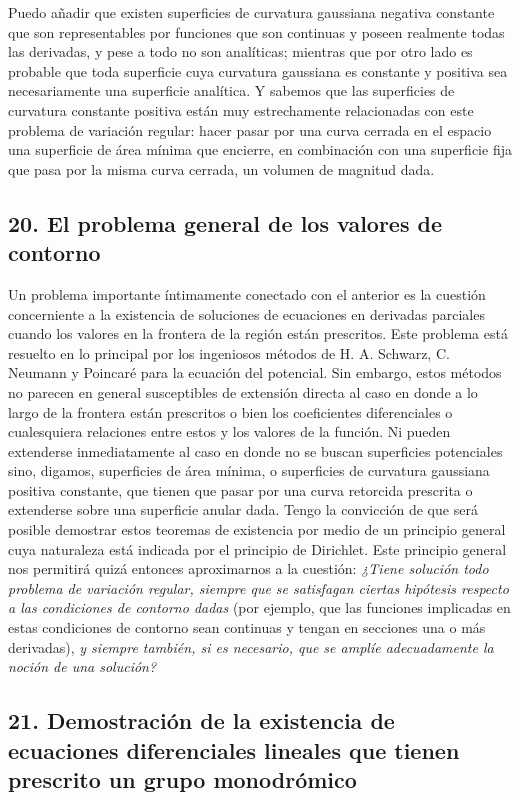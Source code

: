 \documentclass[a4paper, 12pt]{article}
\begin{document}
{Puedo añadir que existen superficies de curvatura gaussiana negativa constante que son representables por funciones que son continuas y poseen realmente todas las derivadas, y pese a todo no son analíticas; mientras que por otro lado es probable que toda superficie cuya curvatura gaussiana es constante y positiva sea necesariamente una superficie analítica. Y sabemos que las superficies de curvatura constante positiva están muy estrechamente relacionadas con este problema de variación regular: hacer pasar por una curva cerrada en el espacio una superficie de área mínima que encierre, en combinación con una superficie fija que pasa por la misma curva cerrada, un volumen de magnitud dada.


\subsection*{20. El problema general de los valores de contorno}

Un problema importante íntimamente conectado con el anterior es la cuestión concerniente a la existencia de soluciones de ecuaciones en derivadas parciales cuando los valores en la frontera de la región están prescritos. Este problema está resuelto en lo principal por los ingeniosos métodos de H. A. Schwarz, C. Neumann y Poincaré para la ecuación del potencial. Sin embargo, estos métodos no parecen en general susceptibles de extensión directa al caso en donde a lo largo de la frontera están prescritos o bien los coeficientes diferenciales o cualesquiera relaciones entre estos y los valores de la función. Ni pueden extenderse inmediatamente al caso en donde no se buscan superficies potenciales sino, digamos, superficies de área mínima, o superficies de curvatura gaussiana positiva constante, que tienen que pasar por una curva retorcida prescrita o extenderse sobre una superficie anular dada. Tengo la convicción de que será posible demostrar estos teoremas de existencia por medio de un principio general cuya naturaleza está indicada por el principio de Dirichlet. Este principio general nos permitirá quizá entonces aproximarnos a la cuestión: \textit{¿Tiene solución todo problema de variación regular, siempre que se satisfagan ciertas hipótesis respecto a las condiciones de contorno dadas} (por ejemplo, que las funciones implicadas en estas condiciones de contorno sean continuas y tengan en secciones una o más derivadas), \textit{y siempre también, si es necesario, que se amplíe adecuadamente la noción de una solución?}


\subsection*{21. Demostración de la existencia de ecuaciones diferenciales
lineales que tienen prescrito un grupo monodrómico}

}
\end{document}
